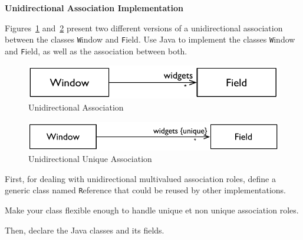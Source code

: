 \documentclass[a4paper,11pt]{memoir}
\newcommand{\code}[1]{{\texttt #1}}
\begin{document}
\begin{exercise}
	\textbf{Unidirectional Association Implementation}

Figures~\ref{fig:unidirectional} and~\ref{fig:unique} present two different versions of a unidirectional association between the classes \code{Window} and \code{Field}.
Use Java to implement the classes \code{Window} and \code{Field}, as well as the association between both.

\begin{figure}[htbp]
	\centering
	\includegraphics[scale=.8]{CD-WindowFieldUni.pdf}
	\caption{Unidirectional Association}
	\label{fig:unidirectional}
\end{figure}

\begin{figure}[htbp]
	\centering
		\includegraphics[scale=.8]{CD-WindowFieldUnique.pdf}
	\caption{Unidirectional Unique Association}
	\label{fig:unique}
\end{figure}



\begin{inparaenum}[(A)]
	\item First, for dealing with unidirectional multivalued association roles, define a generic class named \code{Reference} that could be reused by other implementations.
	\item Make your class flexible enough to handle unique et non unique association roles.
	\item Then, declare the Java classes and its fields.
\end{inparaenum}

\end{exercise}

\begin{solution}
		\lstset{language=Java}
		
			
\end{solution}
\end{document}
